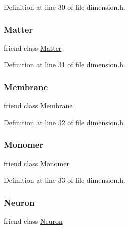 Definition at line 30 of file dimension.\+h.

\mbox{\label{class_dimension_a01ab5ef28c10ff1c9ed0c618fa044aea}} 
\subsubsection{\texorpdfstring{Matter}{Matter}}
{\footnotesize\ttfamily friend class \mbox{\hyperlink{class_matter}{Matter}}\hspace{0.3cm}{\ttfamily [friend]}}



Definition at line 31 of file dimension.\+h.

\mbox{\label{class_dimension_ac790db405644a01723104c3c0c8128bb}} 
\subsubsection{\texorpdfstring{Membrane}{Membrane}}
{\footnotesize\ttfamily friend class \mbox{\hyperlink{class_membrane}{Membrane}}\hspace{0.3cm}{\ttfamily [friend]}}



Definition at line 32 of file dimension.\+h.

\mbox{\label{class_dimension_a9175d4e959674956ccb487d060bac93f}} 
\subsubsection{\texorpdfstring{Monomer}{Monomer}}
{\footnotesize\ttfamily friend class \mbox{\hyperlink{class_monomer}{Monomer}}\hspace{0.3cm}{\ttfamily [friend]}}



Definition at line 33 of file dimension.\+h.

\mbox{\label{class_dimension_aa410d74ba34b18a9f6bdf24323c4ee5b}} 
\subsubsection{\texorpdfstring{Neuron}{Neuron}}
{\footnotesize\ttfamily friend class \mbox{\hyperlink{class_neuron}{Neuron}}\hspace{0.3cm}{\ttfamily [friend]}}



